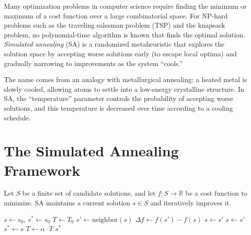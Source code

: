 \documentclass[twoside,12pt]{book}
\theoremstyle{plain}
\theoremstyle{definition}
\theoremstyle{remark}
\begin{document}
Many optimization problems in computer science require finding the minimum or maximum of a cost function over a large combinatorial space. For NP-hard problems such as the traveling salesman problem (TSP) and the knapsack problem, no polynomial-time algorithm is known that finds the optimal solution. \emph{Simulated annealing} (SA) is a randomized metaheuristic that explores the solution space by accepting worse solutions early (to escape local optima) and gradually narrowing to improvements as the system ``cools.''

The name comes from an analogy with metallurgical annealing: a heated metal is slowly cooled, allowing atoms to settle into a low-energy crystalline structure. In SA, the ``temperature'' parameter controls the probability of accepting worse solutions, and this temperature is decreased over time according to a cooling schedule.

\section{The Simulated Annealing Framework}
\label{sec:sa-framework}

Let $S$ be a finite set of candidate solutions, and let $f : S \to \mathbb{R}$ be a cost function to minimize. SA maintains a current solution $s \in S$ and iteratively improves it.

\begin{algorithm}[htbp]
\caption{Simulated Annealing}
\label{alg:simulated-annealing}
\begin{algorithmic}[1]
  \State $s \gets s_0$, $s^* \gets s_0$ 
  \State $T \gets T_0$ 
      \State $s' \gets \text{neighbor}(s)$
      \State $\Delta f \gets f(s') - f(s)$
        \State $s \gets s'$ 
        \State $s \gets s'$ 
      \EndIf
        \State $s^* \gets s$ 
      \EndIf
    \EndFor
    \State $T \gets \alpha \cdot T$ 
  \EndWhile
  \State \Return $s^*$
\EndFunction
\end{algorithmic}
\end{algorithm}
\end{document}
